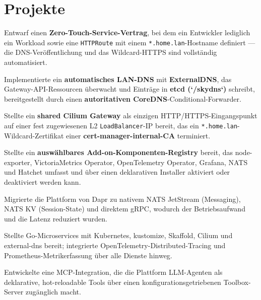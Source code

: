 \documentclass[10pt,a4paper]{resume}
\begin{document}
\vspace{2pt}

\section{Projekte}

\bullets
  \item Entwarf einen \textbf{Zero-Touch-Service-Vertrag}, bei dem ein Entwickler lediglich ein Workload sowie eine \texttt{HTTPRoute} mit einem \texttt{*.home.lan}-Hostname definiert — die DNS-Veröffentlichung und das Wildcard-HTTPS sind vollständig automatisiert.
  \item Implementierte ein \textbf{automatisches LAN-DNS} mit \textbf{ExternalDNS}, das Gateway-API-Ressourcen überwacht und Einträge in \textbf{etcd (`/skydns`)} schreibt, bereitgestellt durch einen \textbf{autoritativen CoreDNS}-Conditional-Forwarder.
  \item Stellte ein \textbf{shared Cilium Gateway} als einzigen HTTP/HTTPS-Eingangspunkt auf einer fest zugewiesenen L2 \texttt{LoadBalancer}-IP bereit, das ein \texttt{*.home.lan}-Wildcard-Zertifikat einer \textbf{cert-manager-internal-CA} terminiert.
  \item Stellte ein \textbf{auswählbares Add-on-Komponenten-Registry} bereit, das node-exporter, VictoriaMetrics Operator, OpenTelemetry Operator, Grafana, NATS und Hatchet umfasst und über einen deklarativen Installer aktiviert oder deaktiviert werden kann.
\bulletsend
\vspace{1.0pt}
\bullets
  \item Migrierte die Plattform von Dapr zu nativem NATS JetStream (Messaging), NATS KV (Session-State) und direktem gRPC, wodurch der Betriebsaufwand und die Latenz reduziert wurden.
  \item Stellte Go-Microservices mit Kubernetes, kustomize, Skaffold, Cilium und external-dns bereit; integrierte OpenTelemetry-Distributed-Tracing und Prometheus-Metrikerfassung über alle Dienste hinweg.
  \item Entwickelte eine MCP-Integration, die die Plattform LLM-Agenten als deklarative, hot-reloadable Tools über einen konfigurationsgetriebenen Toolbox-Server zugänglich macht.
\bulletsend
\end{document}
